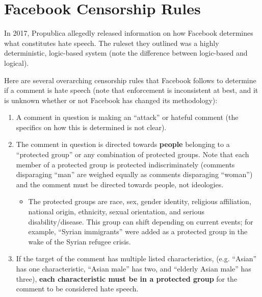 \documentclass[12pt,letterpaper]{article}
\newif\ifsol
\newcommand{\solu}[2]{ \begin{mdframed} \ifsol #2 \else \vspace{#1} \fi \end{mdframed} }
\begin{document}
	\solu{3cm}{
	DNF: $(p $ AND $ q $ AND $ r) $ OR $ (p $ AND $ q $ AND $ $NOT $ r) $ OR $ (p $ AND $ $NOT $ q $ AND $ $NOT $ r) $ OR $ ($NOT $ p $ AND $ q $ AND $ r) $ OR $ ($NOT $ p $ AND $ $NOT $ q $ AND $ $NOT $ r)$
	
	CNF: $($NOT $ p $ OR $ q $ OR $ $NOT $ r) $ AND $ (p $ OR $ $NOT $ q $ OR $ r) $ AND $ (p $ OR $ q $ OR $ $NOT $ r)$
	}
	
\newpage 
 \section*{Facebook Censorship Rules}
  
  In 2017, Propublica allegedly released information on how Facebook determines what constitutes hate speech. The ruleset they outlined was a highly deterministic, logic-based system (note the difference between logic-based and logical). 
  
  Here are several overarching censorship rules that Facebook follows to determine if a comment is hate speech (note that enforcement is inconsistent at best, and it is unknown whether or not Facebook has changed its methodology): 
  
     \begin{enumerate}[1.]
        \item A comment in question is making an “attack” or hateful comment (the specifics on how this is determined is not clear).
        \item The comment in question is directed towards \textbf{people} belonging to a “protected group” or any combination of protected groups. Note that each member of a protected group is protected indiscriminately (comments disparaging “man” are weighed equally as comments disparaging “woman”) and the comment must be directed towards people, not ideologies.
        	\begin{itemize}
                \item The protected groups are race, sex, gender identity, religious affiliation, national origin, ethnicity, sexual orientation, and serious disability/disease. This group can shift depending on current events; for example, “Syrian immigrants” were added as a protected group in the wake of the Syrian refugee crisis.
        	\end{itemize}
        \item If the target of the comment has multiple listed characteristics, (e.g. “Asian” has one characteristic, “Asian male” has two, and “elderly Asian male” has three), \textbf{each characteristic must be in a protected group} for the comment to be considered hate speech.
    \end{enumerate}
    
\end{document}
